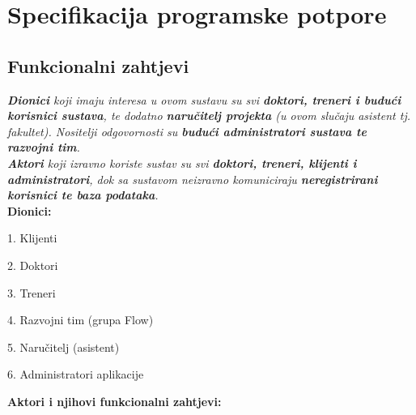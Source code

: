 \chapter{Specifikacija programske potpore}
		
	\section{Funkcionalni zahtjevi}
			
			\textit{ \textbf{Dionici} koji imaju interesa u ovom sustavu su svi \textbf{doktori, treneri i budući korisnici sustava},
			te dodatno \textbf{naručitelj projekta} (u ovom slučaju asistent tj. fakultet). Nositelji odgovornosti su \textbf{budući administratori sustava te razvojni tim}.}\\
				
			\textit{\textbf{Aktori} koji izravno koriste sustav su svi \textbf{doktori, treneri, klijenti i administratori}, dok sa sustavom neizravno komuniciraju \textbf{neregistrirani korisnici te baza podataka}.}\\
			
			
			\noindent \textbf{Dionici:}
			
			\begin{packed_enum}
				
				\item 1. Klijenti
				\item 2. Doktori			
				\item 3. Treneri
				\item 4. Razvojni tim (grupa Flow)
				\item 5. Naručitelj (asistent)
				\item 6. Administratori aplikacije
				
			\end{packed_enum}
			
			\noindent \textbf{Aktori i njihovi funkcionalni zahtjevi:}
			

